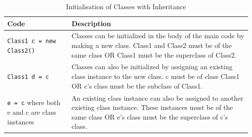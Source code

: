 \documentclass[11pt,a4paper]{article}
\newcommand{\cmd}[1]{\texttt{#1}}
\begin{document}
\begin{table}
    \begin{center}
        \begin{tabular}{|| m{16em} | m{25em} ||} 
        \hline
        Code & Description \\
        \hline
        \cmd{Class1 c = new Class2()} & Classes can be initialized in the body of the main code by making a new class. Class1 and Class2 must be of the same class OR Class1 must be the superclass of Class2.  \\
        \hline
        \cmd{Class1 d = c} & Classes can also be initialized by assigning an existing class instance to the new class. c must be of class Class1 OR c’s class must be the subclass of Class1. \\
        \hline
        \cmd{e = c} where both e and c are class instances & An existing class instance can also be assigned to another existing class instance.
        These instances must be of the same class OR e’s class must be the superclass of c’s class. \\
        \hline        
        \end{tabular}
        \caption{Initialisation of Classes with Inheritance}
    \end{center}


\end{table}
\end{document}
